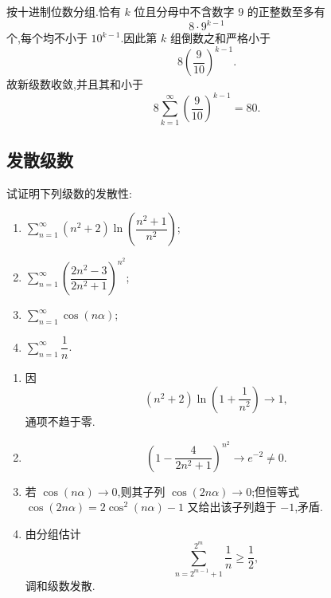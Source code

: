 \begin{solution}
    按十进制位数分组.恰有 $k$ 位且分母中不含数字 $9$ 的正整数至多有
    \[
        8\cdot9^{k-1}
    \]
    个,每个均不小于 $10^{k-1}$.因此第 $k$ 组倒数之和严格小于
    \[
        8\left(\dfrac{9}{10}\right)^{k-1}.
    \]
    故新级数收敛,并且其和小于
    \[
        8\sum\limits_{k=1}^{\infty}\left(\dfrac{9}{10}\right)^{k-1}
        =\boxed{80}.
    \]
\end{solution}



\subsection{发散级数}

\begin{example}
    试证明下列级数的发散性:
    \begin{enumerate}
        \item $\displaystyle\sum\limits_{n=1}^{\infty}(n^2+2)\ln\left(\dfrac{n^2+1}{n^2}\right)$;
        \item $\displaystyle\sum\limits_{n=1}^{\infty}\left(\dfrac{2n^2-3}{2n^2+1}\right)^{n^2}$;
        \item $\displaystyle\sum\limits_{n=1}^{\infty}\cos(n\alpha)$;
        \item $\displaystyle\sum\limits_{n=1}^{\infty}\dfrac{1}{n}$.
    \end{enumerate}
\end{example}
\exampleblank

\begin{solution}
    \leavevmode
    \begin{enumerate}
        \item 因
              \[
                  (n^2+2)\ln\left(1+\dfrac{1}{n^2}\right)\longrightarrow1,
              \]
              通项不趋于零.
        \item
              \[
                  \left(1-\dfrac{4}{2n^2+1}\right)^{n^2}\longrightarrow e^{-2}\neq0.
              \]
        \item 若 $\cos(n\alpha)\to0$,则其子列 $\cos(2n\alpha)\to0$;但恒等式
              $\cos(2n\alpha)=2\cos^2(n\alpha)-1$ 又给出该子列趋于 $-1$,矛盾.
        \item 由分组估计
              \[
                  \displaystyle\sum\limits_{n=2^{m-1}+1}^{2^m}\dfrac{1}{n}\geq\dfrac{1}{2},
              \]
              调和级数发散.
    \end{enumerate}
\end{solution}

